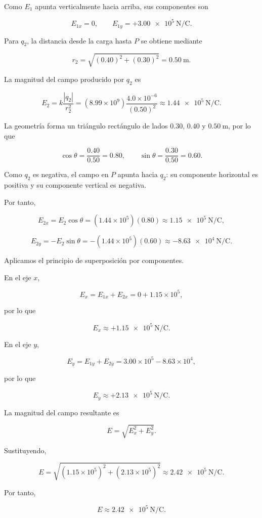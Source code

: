 Como \(E_1\) apunta verticalmente hacia arriba, sus componentes son

\[
\boxed{E_{1x}=0}, \qquad
\boxed{E_{1y}=+\SI{3.00e5}{\newton\per\coulomb}}.
\]

Para \(q_2\), la distancia desde la carga hasta \(P\) se obtiene mediante

\[
r_2=\sqrt{(0.40)^2+(0.30)^2}=\SI{0.50}{\metre}.
\]

La magnitud del campo producido por \(q_2\) es

\[
E_2=k\frac{|q_2|}{r_2^2}
=(8.99\times10^9)\frac{4.0\times10^{-6}}{(0.50)^2}
\approx\SI{1.44e5}{\newton\per\coulomb}.
\]

La geometría forma un triángulo rectángulo de lados \(0.30\), \(0.40\) y
\(\SI{0.50}{\metre}\), por lo que

\[
\cos\theta=\frac{0.40}{0.50}=0.80,
\qquad
\sin\theta=\frac{0.30}{0.50}=0.60.
\]

Como \(q_2\) es negativa, el campo en \(P\) apunta hacia \(q_2\): su componente
horizontal es positiva y su componente vertical es negativa.

Por tanto,

\[
E_{2x}=E_2\cos\theta=(1.44\times10^5)(0.80)
\approx\SI{1.15e5}{\newton\per\coulomb},
\]

\[
E_{2y}=-E_2\sin\theta=-(1.44\times10^5)(0.60)
\approx-\SI{8.63e4}{\newton\per\coulomb}.
\]

Aplicamos el principio de superposición por componentes.

En el eje \(x\),

\[
E_x=E_{1x}+E_{2x}=0+1.15\times10^5,
\]

por lo que

\[
\boxed{E_x\approx+\SI{1.15e5}{\newton\per\coulomb}}.
\]

En el eje \(y\),

\[
E_y=E_{1y}+E_{2y}=3.00\times10^5-8.63\times10^4,
\]

por lo que

\[
\boxed{E_y\approx+\SI{2.13e5}{\newton\per\coulomb}}.
\]

La magnitud del campo resultante es

\[
E=\sqrt{E_x^2+E_y^2}.
\]

Sustituyendo,

\[
E=\sqrt{(1.15\times10^5)^2+(2.13\times10^5)^2}
\approx\SI{2.42e5}{\newton\per\coulomb}.
\]

Por tanto,

\[
\boxed{E\approx\SI{2.42e5}{\newton\per\coulomb}}.
\]

